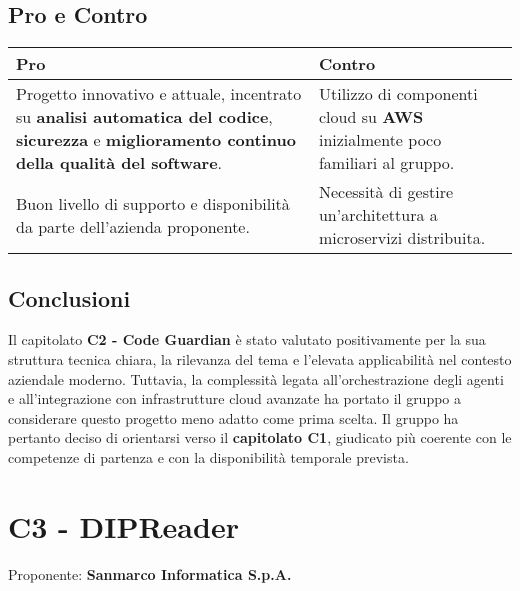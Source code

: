 \documentclass[a4paper,12pt]{article}
\begin{document}
{{    \subsection{Pro e Contro}
        \begin{center}
            \begin{tabular}{|p{9cm}|p{5cm}|}
                \hline
                \textbf{Pro} & \textbf{Contro} \\
                \hline
                Progetto innovativo e attuale, incentrato su \textbf{analisi automatica del codice}, \textbf{sicurezza} e \textbf{miglioramento continuo della qualità del software}. & Utilizzo di componenti cloud su \textbf{AWS} inizialmente poco familiari al gruppo. \\
                \hline
                Buon livello di supporto e disponibilità da parte dell’azienda proponente. & Necessità di gestire un’architettura a microservizi distribuita. \\
                \hline
            \end{tabular}
        \end{center}
    

    \subsection{Conclusioni}
        Il capitolato \textbf{C2 - Code Guardian} è stato valutato positivamente per la sua struttura tecnica chiara, la rilevanza del tema e l’elevata applicabilità nel contesto aziendale moderno.
        Tuttavia, la complessità legata all’orchestrazione degli agenti e all’integrazione con infrastrutture cloud avanzate ha portato il gruppo a considerare questo progetto meno adatto come prima scelta.
        Il gruppo ha pertanto deciso di orientarsi verso il \textbf{capitolato C1}, giudicato più coerente con le competenze di partenza e con la disponibilità temporale prevista.
    

\newpage

\section{C3 - DIPReader}
    Proponente: \textbf{Sanmarco Informatica S.p.A.}

}}
\end{document}
